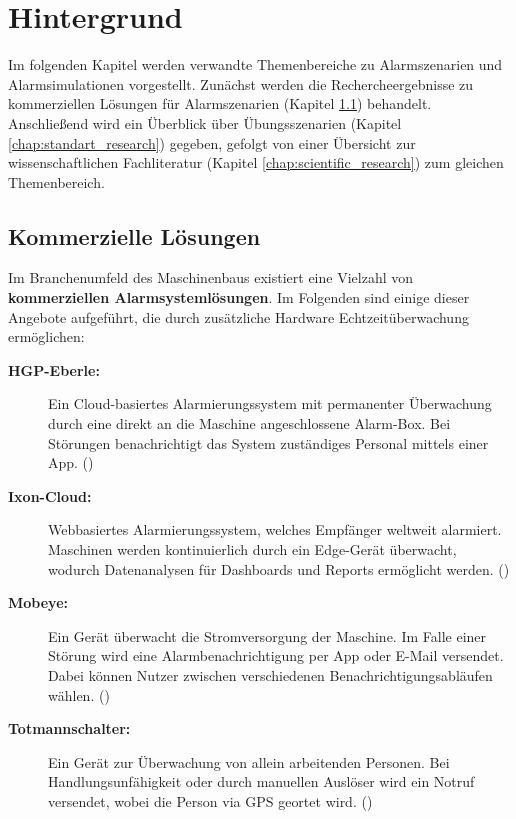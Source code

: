 \section{Hintergrund}

Im folgenden Kapitel werden verwandte Themenbereiche zu Alarmszenarien und Alarmsimulationen vorgestellt. Zunächst werden die Rechercheergebnisse zu kommerziellen Lösungen für Alarmszenarien (Kapitel \ref{chap:commercial_research}) behandelt. Anschließend wird ein Überblick über Übungsszenarien (Kapitel \ref{chap:standart_research}) gegeben, gefolgt von einer Übersicht zur wissenschaftlichen Fachliteratur  (Kapitel \ref{chap:scientific_research}) zum gleichen Themenbereich.

\subsection{Kommerzielle Lösungen}
\label{chap:commercial_research}
Im Branchenumfeld des Maschinenbaus existiert eine Vielzahl von \textbf{kommerziellen Alarmsystemlösungen}. Im Folgenden sind einige dieser Angebote aufgeführt, die durch zusätzliche Hardware Echtzeitüberwachung ermöglichen:

\begin{description}
    \item [\textbf{HGP-Eberle:}] 
    Ein Cloud-basiertes Alarmierungssystem mit permanenter Überwachung durch eine direkt an die Maschine angeschlossene Alarm-Box. Bei Störungen benachrichtigt das System zuständiges Personal mittels einer App. (\cite{HGP-Eberle})
   
   \item [\textbf{Ixon-Cloud:}] 
   Webbasiertes Alarmierungssystem, welches Empfänger weltweit alarmiert. Maschinen werden kontinuierlich durch ein Edge-Gerät überwacht, wodurch Datenanalysen für Dashboards und Reports ermöglicht werden. (\cite{Ixon-Cloud})
   
   \item [\textbf{Mobeye:}] 
   Ein Gerät überwacht die Stromversorgung der Maschine. Im Falle einer Störung wird eine Alarmbenachrichtigung per App oder E-Mail versendet. Dabei können Nutzer zwischen verschiedenen Benachrichtigungsabläufen wählen. (\cite{Mobeye})
   
   \item [\textbf{Totmannschalter:}] 
    Ein Gerät zur Überwachung von allein arbeitenden Personen. Bei Handlungsunfähigkeit oder durch manuellen Auslöser wird ein Notruf versendet, wobei die Person via GPS geortet wird. (\cite{totmann})
\end{description}
 
